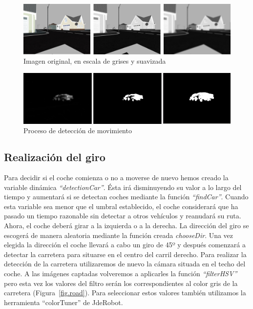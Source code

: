 \begin{figure}[H]
  \begin{center}
    \includegraphics[width=1.0\textwidth]{figures/Stop/imgL.jpg}
		\caption{Imagen original, en escala de grises y suavizada}
		\label{fig.imgL}
		\end{center}
\end{figure}

\begin{figure}[H]
  \begin{center}
    \includegraphics[width=1.0\textwidth]{figures/Stop/motionDetection.jpg}
		\caption{Proceso de detección de movimiento}
		\label{fig.motionDetection}
		\end{center}
\end{figure}

\subsection{Realización del giro}
Para decidir si el coche comienza o no a moverse de nuevo hemos creado la variable dinámica \textit{``detectionCar''}. Ésta irá disminuyendo su valor a lo largo del tiempo y aumentará si se detectan coches mediante la función \textit{``findCar''}. Cuando esta variable sea menor que el umbral establecido, el coche considerará que ha pasado un tiempo razonable sin detectar a otros vehículos y reanudará su ruta. \\

Ahora, el coche deberá girar a la izquierda o a la derecha. La dirección del giro se escogerá de manera aleatoria mediante la función creada \textit{chooseDir}. Una vez elegida la dirección el coche llevará a cabo un giro de 45º y después comenzará a detectar la carretera para situarse en el centro del carril derecho. Para realizar la detección de la carretera utilizaremos de nuevo la cámara situada en el techo del coche. A las imágenes captadas volveremos a aplicarles la función \textit{``filterHSV''} pero esta vez los valores del filtro serán los correspondientes al color gris de la carretera (Figura~\ref{fig.road}). Para seleccionar estos valores también utilizamos la herramienta ``colorTuner'' de JdeRobot.\\

